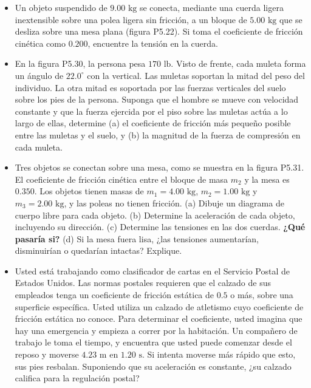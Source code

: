 \documentclass[11pt,a4paper]{article}
\begin{document}
\begin{itemize}
    \item[\textbf{29.}] Un objeto suspendido de $9.00 \text{ kg}$ se conecta, mediante una cuerda ligera inextensible sobre una polea ligera sin fricción, a un bloque de $5.00 \text{ kg}$ que se desliza sobre una mesa plana (figura P5.22). Si toma el coeficiente de fricción cinética como $0.200$, encuentre la tensión en la cuerda.
    \vspace*{6cm}
\end{itemize}

\newpage

\begin{itemize}
    \item[\textbf{30.}] En la figura P5.30, la persona pesa $170 \text{ lb}$. Visto de frente, cada muleta forma un ángulo de $22.0^\circ$ con la vertical. Las muletas soportan la mitad del peso del individuo. La otra mitad es soportada por las fuerzas verticales del suelo sobre los pies de la persona. Suponga que el hombre se mueve con velocidad constante y que la fuerza ejercida por el piso sobre las muletas actúa a lo largo de ellas, determine (a) el coeficiente de fricción más pequeño posible entre las muletas y el suelo, y (b) la magnitud de la fuerza de compresión en cada muleta.
    \vspace*{6cm}

    \item[\textbf{31.}] Tres objetos se conectan sobre una mesa, como se muestra en la figura P5.31. El coeficiente de fricción cinética entre el bloque de masa $m_2$ y la mesa es $0.350$. Los objetos tienen masas de $m_1 = 4.00 \text{ kg}$, $m_2 = 1.00 \text{ kg}$ y $m_3 = 2.00 \text{ kg}$, y las poleas no tienen fricción. (a) Dibuje un diagrama de cuerpo libre para cada objeto. (b) Determine la aceleración de cada objeto, incluyendo su dirección. (c) Determine las tensiones en las dos cuerdas. \textbf{¿Qué pasaría si?} (d) Si la mesa fuera lisa, ¿las tensiones aumentarían, disminuirían o quedarían intactas? Explique.
    \vspace*{8cm}

    \item[\textbf{32.}] Usted está trabajando como clasificador de cartas en el Servicio Postal de Estados Unidos. Las normas postales requieren que el calzado de sus empleados tenga un coeficiente de fricción estática de $0.5$ o más, sobre una superficie específica. Usted utiliza un calzado de atletismo cuyo coeficiente de fricción estática no conoce. Para determinar el coeficiente, usted imagina que hay una emergencia y empieza a correr por la habitación. Un compañero de trabajo le toma el tiempo, y encuentra que usted puede comenzar desde el reposo y moverse $4.23 \text{ m}$ en $1.20 \text{ s}$. Si intenta moverse más rápido que esto, sus pies resbalan. Suponiendo que su aceleración es constante, ¿su calzado califica para la regulación postal?
    \vspace*{6cm}


\end{itemize}
\end{document}
